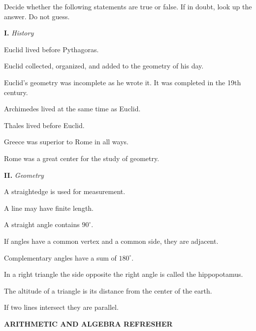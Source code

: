\documentclass[11pt]{book}
\theoremstyle{bkplain}
\theoremstyle{XIplainnote}
\theoremstyle{bkplain}
\theoremstyle{bkplain}
\begin{document}
Decide whether the following statements are true or false. If in doubt, look up
the answer. Do not guess.

\medskip
\noindent\textbf{I.} \emph{History}
\begin{exlist}
\item Euclid lived before Pythagoras.
\item Euclid collected, organized, and added to the geometry of his day.
\item Euclid's geometry was incomplete as he wrote it. It was completed in the
      19th century.
\item Archimedes lived at the same time as Euclid.
\item Thales lived before Euclid.
\item Greece was superior to Rome in all ways.
\item Rome was a great center for the study of geometry.
\end{exlist}

\medskip
\noindent\textbf{II.} \emph{Geometry}
\begin{exlist}
\item A straightedge is used for measurement.
\item A line may have finite length.
\item A straight angle contains $90^\circ$.
\item If angles have a common vertex and a common side, they are adjacent.
\item Complementary angles have a sum of $180^\circ$.
\item In a right triangle the side opposite the right angle is called the
      hippopotamus.
\item The altitude of a triangle is its distance from the center of the earth.
\item If two lines intersect they are parallel.
\end{exlist}

\begin{center}\bfseries ARITHMETIC AND ALGEBRA REFRESHER\end{center}
\nopagebreak
\end{document}
